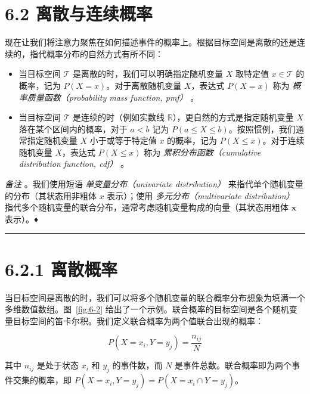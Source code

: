 \section*{6.2 离散与连续概率}
\label{sec:6.2}

现在让我们将注意力聚焦在如何描述事件的概率上。根据目标空间是离散的还是连续的，指代概率分布的自然方式有所不同：

\begin{itemize}
\item 当目标空间 $ \mathcal{T} $ 是离散的时，我们可以明确指定随机变量 $ X $ 取特定值 $ x \in \mathcal{T} $ 的概率，记为 $ P(X = x) $。对于离散随机变量 $ X $，表达式 $ P(X = x) $ 称为 \emph{概率质量函数（probability mass function, pmf）} 。
\item 当目标空间 $ \mathcal{T} $ 是连续的时（例如实数线 $ \mathbb{R} $），更自然的方式是指定随机变量 $ X $ 落在某个区间内的概率，对于 $ a < b $ 记为 $ P(a \leqslant X \leqslant b) $。按照惯例，我们通常指定随机变量 $ X $ 小于或等于特定值 $ x $ 的概率，记为 $ P(X \leqslant x) $。对于连续随机变量 $ X $，表达式 $ P(X \leqslant x) $ 称为 \emph{累积分布函数（cumulative distribution function, cdf）} 。
\end{itemize}

\emph{备注} 。我们使用短语 \emph{单变量分布（univariate distribution）} 来指代单个随机变量的分布（其状态用非粗体 $ x $ 表示）；使用 \emph{多元分布（multivariate distribution）} 指代多个随机变量的联合分布，通常考虑随机变量构成的向量（其状态用粗体 $ \boldsymbol{x} $ 表示）。♦

\medskip\hrule\medskip

\section*{6.2.1 离散概率}

当目标空间是离散的时，我们可以将多个随机变量的联合概率分布想象为填满一个多维数值数组。图~\ref{fig:6-2} 给出了一个示例。联合概率的目标空间是各个随机变量目标空间的笛卡尔积。我们定义联合概率为两个值联合出现的概率：

\begin{equation}
P(X = x_i, Y = y_j) = \frac{n_{ij}}{N}
\tag{6.9}\label{eq:6-9}
\end{equation}

其中 $ n_{ij} $ 是处于状态 $ x_i $ 和 $ y_j $ 的事件数，而 $ N $ 是事件总数。联合概率即为两个事件交集的概率，即 $ P(X = x_i, Y = y_j) = P(X = x_i \cap Y = y_j) $。


